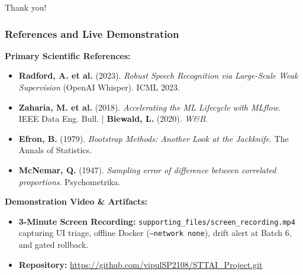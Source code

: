 \documentclass[10pt]{beamer}
\begin{document}
\begin{frame}
    \textcolor{myNewColorA}{\Huge{\centerline{Thank you!}}}
    \vspace{0.4cm}
    \frametitle{References and Live Demonstration}

    \footnotesize
    \textbf{Primary Scientific References:}
    \begin{itemize}\setlength{\itemsep}{1pt}
        \item \textbf{Radford, A. et al.} (2023). \textit{Robust Speech Recognition via Large-Scale Weak Supervision} (OpenAI Whisper). ICML 2023.
        \item \textbf{Zaharia, M. et al.} (2018). \textit{Accelerating the ML Lifecycle with MLflow}. IEEE Data Eng. Bull. \quad | \quad \textbf{Biewald, L.} (2020). \textit{W\&B}.
        \item \textbf{Efron, B.} (1979). \textit{Bootstrap Methods: Another Look at the Jackknife}. The Annals of Statistics.
        \item \textbf{McNemar, Q.} (1947). \textit{Sampling error of difference between correlated proportions}. Psychometrika.
    \end{itemize}
    \vspace{3pt}
    \textbf{Demonstration Video \& Artifacts:}
    \begin{itemize}\setlength{\itemsep}{1pt}
        \item \textbf{3-Minute Screen Recording:} \texttt{supporting\_files/screen\_recording.mp4} capturing UI triage, offline Docker (\texttt{--network none}), drift alert at Batch 6, and gated rollback.
        \item \textbf{Repository:} \url{https://github.com/vipulSP2108/STTAI_Project.git}
    \end{itemize}
\end{frame}
\end{document}
